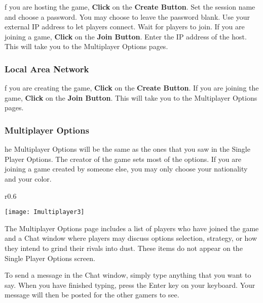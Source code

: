 f you are hosting the game, \textbf{Click} on the \textbf{Create Button}. Set the session name and choose a password. You may choose to leave the password blank. Use your external IP address to let players connect. Wait for players to join. If you are joining a game, \textbf{Click} on the \textbf{Join Button}. Enter the IP address of the host. This will take you to the Multiplayer Options pages.

\subsubsection{\textsf{Local Area Network}}

f you are creating the game, \textbf{Click} on the \textbf{Create Button}. If you are joining the game, \textbf{Click} on the \textbf{Join Button}. This will take you to the Multiplayer Options pages.

\subsubsection{\textsf{Multiplayer Options}}

he Multiplayer Options will be the same as the ones that you saw in the Single Player Options. The creator of the game sets most of the options. If you are joining a game created by someone else, you may only choose your nationality and your color.

\begin{wrapfigure}{r}{0.6\textwidth}
    \begin{center}
        \vspace{-20pt}
        \texttt{[image: Imultiplayer3]} %
    \end{center}
    \vspace{-20pt}
\end{wrapfigure}


The Multiplayer Options page includes a list of players who have joined the game and a Chat window where players may discuss options selection, strategy, or how they intend to grind their rivals into dust. These items do not appear on the Single Player Options screen.


To send a message in the Chat window, simply type anything that you want to say. When you have finished typing, press the Enter key on your keyboard. Your message will then be posted for the other gamers to see.

